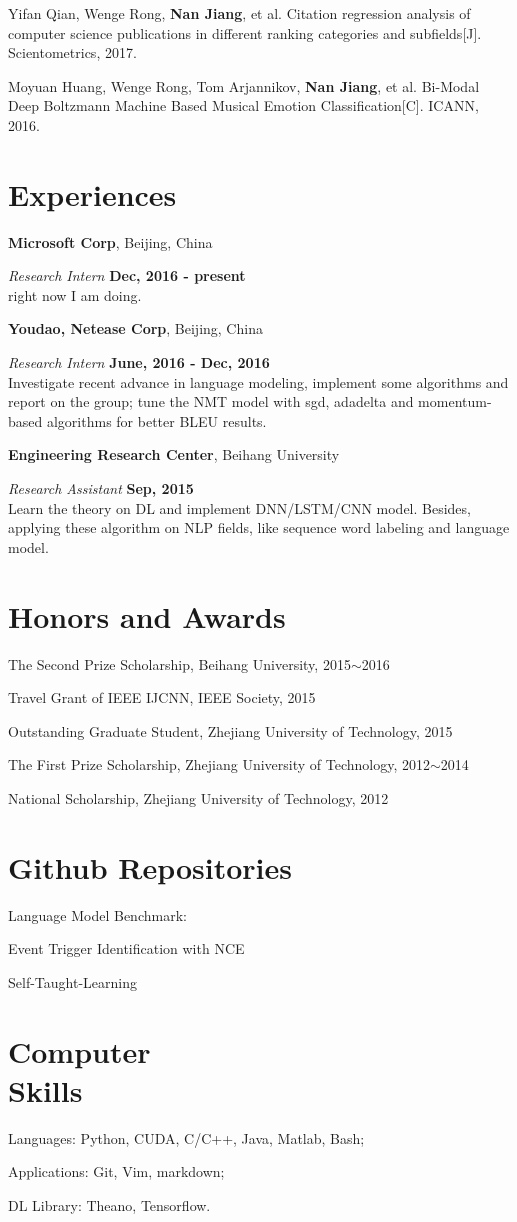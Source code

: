 \documentclass[margin,line]{resume}
\begin{document}
\begin{resume}
Yifan Qian, Wenge Rong, \textbf{Nan Jiang}, et al. Citation regression analysis of computer science publications in different ranking categories and subfields[J]. Scientometrics, 2017.

Moyuan Huang, Wenge Rong, Tom Arjannikov, \textbf{Nan Jiang}, et al. Bi-Modal Deep Boltzmann Machine Based Musical Emotion Classification[C]. ICANN, 2016.



\section{Experiences}
{\bf Microsoft Corp}, Beijing, China

{\em Research Intern} \hfill {\bf Dec, 2016 - present}\\
right now I am doing.


{\bf Youdao, Netease Corp}, Beijing, China

{\em Research Intern} \hfill {\bf June, 2016 - Dec, 2016}\\
Investigate recent advance in language modeling, implement some algorithms and report on the group; tune the NMT model with sgd, adadelta and momentum-based algorithms for better BLEU results.


{\bf Engineering Research Center}, Beihang University

{\em Research Assistant} \hfill {\bf Sep, 2015 }\\
Learn the theory on DL and implement DNN/LSTM/CNN model. Besides, applying these algorithm on NLP fields, like sequence word labeling and language model.



\section{Honors and Awards}

The Second Prize Scholarship, Beihang University, 2015$\sim$2016

Travel Grant of IEEE IJCNN, IEEE Society, 2015

Outstanding Graduate Student, Zhejiang University of Technology, 2015

The First Prize Scholarship, Zhejiang University of Technology, 2012$\sim$2014

National Scholarship, Zhejiang University of Technology, 2012

\section{Github Repositories}

Language Model Benchmark:

Event Trigger Identification with NCE

Self-Taught-Learning


\section{Computer \\ Skills}
Languages:  Python, CUDA, C/C++, Java, Matlab, Bash;

Applications: Git, Vim, markdown;

DL Library: Theano, Tensorflow.\\




\end{resume}
\end{document}
